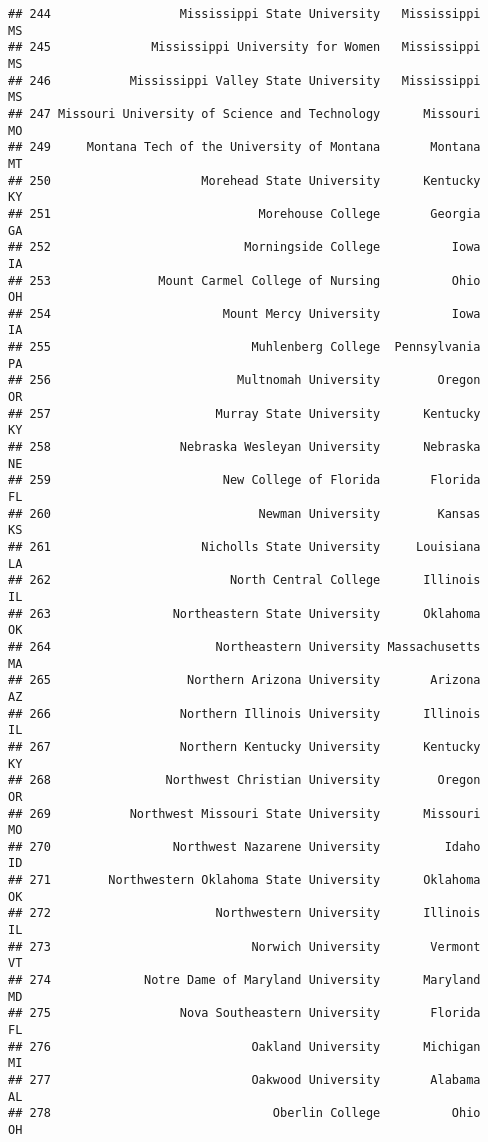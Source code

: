 \documentclass[
]{article}
\begin{document}
\begin{verbatim}
## 244                  Mississippi State University   Mississippi         MS
## 245              Mississippi University for Women   Mississippi         MS
## 246           Mississippi Valley State University   Mississippi         MS
## 247 Missouri University of Science and Technology      Missouri         MO
## 249     Montana Tech of the University of Montana       Montana         MT
## 250                     Morehead State University      Kentucky         KY
## 251                             Morehouse College       Georgia         GA
## 252                           Morningside College          Iowa         IA
## 253               Mount Carmel College of Nursing          Ohio         OH
## 254                        Mount Mercy University          Iowa         IA
## 255                            Muhlenberg College  Pennsylvania         PA
## 256                          Multnomah University        Oregon         OR
## 257                       Murray State University      Kentucky         KY
## 258                  Nebraska Wesleyan University      Nebraska         NE
## 259                        New College of Florida       Florida         FL
## 260                             Newman University        Kansas         KS
## 261                     Nicholls State University     Louisiana         LA
## 262                         North Central College      Illinois         IL
## 263                 Northeastern State University      Oklahoma         OK
## 264                       Northeastern University Massachusetts         MA
## 265                   Northern Arizona University       Arizona         AZ
## 266                  Northern Illinois University      Illinois         IL
## 267                  Northern Kentucky University      Kentucky         KY
## 268                Northwest Christian University        Oregon         OR
## 269           Northwest Missouri State University      Missouri         MO
## 270                 Northwest Nazarene University         Idaho         ID
## 271        Northwestern Oklahoma State University      Oklahoma         OK
## 272                       Northwestern University      Illinois         IL
## 273                            Norwich University       Vermont         VT
## 274             Notre Dame of Maryland University      Maryland         MD
## 275                  Nova Southeastern University       Florida         FL
## 276                            Oakland University      Michigan         MI
## 277                            Oakwood University       Alabama         AL
## 278                               Oberlin College          Ohio         OH

\end{verbatim}
\end{document}

